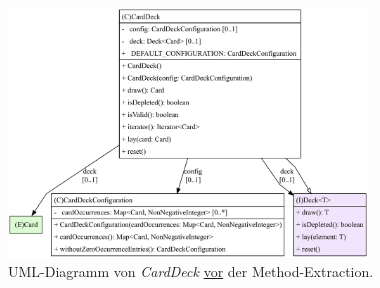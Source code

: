 

\begin{figure}[H]
	\centering
	\includegraphics[width=0.85\textwidth]{Bilder/CardDeck_extract-before_structure.pdf} 
	\caption{UML-Diagramm von \textit{CardDeck} \underline{vor} der Method-Extraction.}
	\label{fig:extract-before}
\end{figure} 



